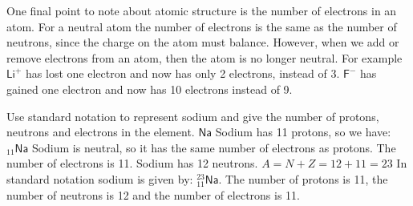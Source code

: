 \label{m38745*eip-950}\vspace{.5cm} 
      \noindent 
One final point to note about atomic structure is the number of electrons in an atom. For a neutral atom the number of electrons is the same as the number of neutrons, since the charge on the atom must balance. However, when we add or remove electrons from an atom, then the atom is no longer neutral. For example $\mathsf{Li}^{+}$ has lost one electron and now has only 2 electrons, instead of 3. $\mathsf{F}^{-}$ has gained one electron and now has 10 electrons instead of 9.   
\begin{wex}
{%
}
{%
Use standard notation to represent sodium and give the number of protons, neutrons and electrons in the element.
}
{%
 $\mathsf{Na}$
 Sodium has 11 protons, so we have: ${}_{11}\mathsf{Na}$
 Sodium is neutral, so it has the same number of electrons as protons. The number of electrons is 11.
 Sodium has 12 neutrons.
 $A=N+Z=12+11=23$
 In standard notation sodium is given by: $_{11}^{23}\mathsf{Na}$. The number of protons is 11, the number of neutrons is 12 and the number of electrons is 11.
}    
\end{wex}
    

